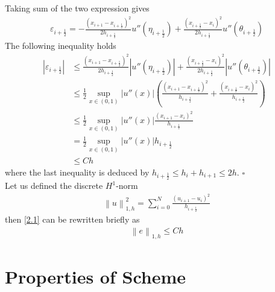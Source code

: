 \documentclass[a4paper]{article}
\numberwithin{equation}{section}
\begin{document}
Taking sum of the two expression gives
\begin{align}
{\varepsilon_{i + \frac{1}{2}}} =  - \frac{{{{\left( {{x_{i + 1}} - {x_{i + \frac{1}{2}}}} \right)}^2}}}{{2{h_{i + \frac{1}{2}}}}}u''\left( {{\eta _{i + \frac{1}{2}}}} \right) + \frac{{{{\left( {{x_{i + \frac{1}{2}}} - {x_i}} \right)}^2}}}{{2{h_{i + \frac{1}{2}}}}}u''\left( {{\theta _{i + \frac{1}{2}}}} \right)
\end{align}
The following inequality holds
\begin{align}
\left| {{\varepsilon_{i + \frac{1}{2}}}} \right| &\le \frac{{{{\left( {{x_{i + 1}} - {x_{i + \frac{1}{2}}}} \right)}^2}}}{{2{h_{i + \frac{1}{2}}}}}\left| {u''\left( {{\eta _{i + \frac{1}{2}}}} \right)} \right| + \frac{{{{\left( {{x_{i + \frac{1}{2}}} - {x_i}} \right)}^2}}}{{2{h_{i + \frac{1}{2}}}}}\left| {u''\left( {{\theta _{i + \frac{1}{2}}}} \right)} \right|\\
 &\le \frac{1}{2}\mathop {\sup }\limits_{x \in \left( {0,1} \right)} \left| {u''\left( x \right)} \right|\left( {\frac{{{{\left( {{x_{i + 1}} - {x_{i + \frac{1}{2}}}} \right)}^2}}}{{{h_{i + \frac{1}{2}}}}} + \frac{{{{\left( {{x_{i + \frac{1}{2}}} - {x_i}} \right)}^2}}}{{{h_{i + \frac{1}{2}}}}}} \right)\\
 &\le \frac{1}{2}\mathop {\sup }\limits_{x \in \left( {0,1} \right)} \left| {u''\left( x \right)} \right|\frac{{{{\left( {{x_{i + 1}} - {x_i}} \right)}^2}}}{{{h_{i + \frac{1}{2}}}}}\\
& = \frac{1}{2}\mathop {\sup }\limits_{x \in \left( {0,1} \right)} \left| {u''\left( x \right)} \right|{h_{i + \frac{1}{2}}}\\
& \le Ch
\end{align}
where the last inequality is deduced by ${h_{i + \frac{1}{2}}} \le {h_i} + {h_{i + 1}} \le 2h$. \hfill $\square$\\

Let us defined the discrete $H^1$-norm
\begin{align}
\left\| u \right\|_{1,h}^2 = \sum\limits_{i = 0}^N {\frac{{{{\left( {{u_{i + 1}} - {u_i}} \right)}^2}}}{{{h_{i + \frac{1}{2}}}}}} 
\end{align}
then \eqref{2.1} can be rewritten briefly as
\begin{align}
{\left\| e \right\|_{1,h}} \le Ch
\end{align}
\section{Properties of Scheme}
\end{document}
